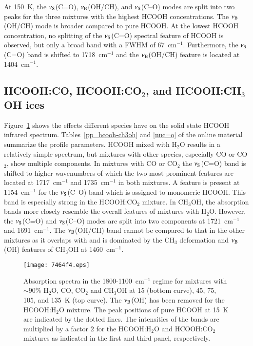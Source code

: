 \documentclass{aa}
\begin{document}
At 150~K, the $\nu_{\rm S}$(C=O), $\nu_{\rm B}$(OH/CH), and $\nu_{\rm
S}$(C--O) modes are split into two peaks for the three mixtures with
the highest HCOOH concentrations. The $\nu_{\rm B}$(OH/CH) mode is
broader compared to pure HCOOH. At the lowest HCOOH concentration, no
splitting of the $\nu_{\rm S}$(C=O) spectral feature of HCOOH is
observed, but only a broad band with a FWHM of
67~cm$^{-1}$. Furthermore, the $\nu_{\rm S}$(C=O) band is shifted to
1718~cm$^{-1}$ and the $\nu_{\rm B}$(OH/CH) feature is located at
1404~cm$^{-1}$.

\subsection{HCOOH:CO, HCOOH:CO$_2$, and HCOOH:CH$_3$OH ices}
\label{mix_sec}
Figure~\ref{solvT} shows the effects different species have on the
solid state HCOOH infrared spectrum. Tables~\ref{pp_hcooh-ch3oh} and
\ref{nuc=o} of the online material summarize the profile
parameters. HCOOH mixed with H$_2$O results in a relatively simple
spectrum, but mixtures with other species, especially CO or CO$_2$,
show multiple components. In mixtures with CO or CO$_2$ the $\nu_{\rm
S}$(C=O) band is shifted to higher wavenumbers of which the two most
prominent features are located at 1717~cm$^{-1}$ and 1735~cm$^{-1}$ in
both mixtures. A feature is present at 1154~cm$^{-1}$ for the
$\nu_{\rm S}$(C--O) band which is assigned to monomeric HCOOH. This
band is especially strong in the HCOOH:CO$_2$ mixture. In CH$_3$OH,
the absorption bands more closely resemble the overall features of
mixtures with H$_2$O. However, the $\nu_{\rm S}$(C=O) and $\nu_{\rm
S}$(C--O) modes are split into two components at 1721~cm$^{-1}$ and
1691~cm$^{-1}$. The $\nu_{\rm B}$(OH/CH) band cannot be compared to
that in the other mixtures as it overlaps with and is dominated by the
CH$_3$ deformation and $\nu_{\rm B}$(OH) features of CH$_3$OH at
1460~cm$^{-1}$.

\begin{figure*}
\centering
\texttt{[image: 7464f4.eps]}
\caption{Absorption spectra in the 1800-1100~cm$^{-1}$ regime for
mixtures with $\sim$90\% H$_2$O, CO, CO$_2$ and CH$_3$OH at 15 (bottom
curve), 45, 75, 105, and 135~K (top curve). The $\nu_{\rm B}$(OH) has
been removed for the HCOOH:H$_2$O mixture. The peak positions of pure
HCOOH at 15~K are indicated by the dotted lines. The intensities of
the bands are multiplied by a factor 2 for the HCOOH:H$_2$O and
HCOOH:CO$_2$ mixtures as indicated in the first and third panel,
respectively.\label{solvT}}
\end{figure*}
\end{document}
